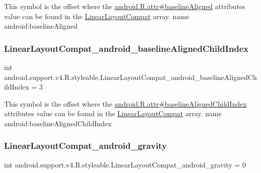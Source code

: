 This symbol is the offset where the \hyperlink{}{android.\+R.\+attr\#baseline\+Aligned} attribute\textquotesingle{}s value can be found in the \hyperlink{classandroid_1_1support_1_1v4_1_1R_1_1styleable_a5410acb05d349e2b35bd2dbadc93b229}{Linear\+Layout\+Compat} array.  name android\+:baseline\+Aligned \mbox{\label{classandroid_1_1support_1_1v4_1_1R_1_1styleable_a2c50eb551dc4f5ea5db0ac221a8ca0d7}} 
\subsubsection{\texorpdfstring{Linear\+Layout\+Compat\+\_\+android\+\_\+baseline\+Aligned\+Child\+Index}{LinearLayoutCompat\_android\_baselineAlignedChildIndex}}
{\footnotesize\ttfamily int android.\+support.\+v4.\+R.\+styleable.\+Linear\+Layout\+Compat\+\_\+android\+\_\+baseline\+Aligned\+Child\+Index = 3\hspace{0.3cm}{\ttfamily [static]}}

This symbol is the offset where the \hyperlink{}{android.\+R.\+attr\#baseline\+Aligned\+Child\+Index} attribute\textquotesingle{}s value can be found in the \hyperlink{classandroid_1_1support_1_1v4_1_1R_1_1styleable_a5410acb05d349e2b35bd2dbadc93b229}{Linear\+Layout\+Compat} array.  name android\+:baseline\+Aligned\+Child\+Index \mbox{\label{classandroid_1_1support_1_1v4_1_1R_1_1styleable_aa1757dce9a8d990b61214a54ba88e2fc}} 
\subsubsection{\texorpdfstring{Linear\+Layout\+Compat\+\_\+android\+\_\+gravity}{LinearLayoutCompat\_android\_gravity}}
{\footnotesize\ttfamily int android.\+support.\+v4.\+R.\+styleable.\+Linear\+Layout\+Compat\+\_\+android\+\_\+gravity = 0\hspace{0.3cm}{\ttfamily [static]}}

